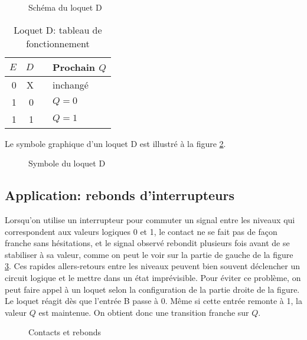 \documentclass[11pt]{article}
\begin{document}
\begin{figure}[htbp]
\centering

\caption{\label{fig:orge018db5}Schéma du loquet D}
\end{figure}

\begin{table}[htbp]
\caption{\label{tab:org54e7fb9}Loquet D: tableau de fonctionnement}
\centering
\begin{tabular}{rrll}
\(E\) & \(D\) &  & Prochain \(Q\)\\[0pt]
\hline
0 & X &  & inchangé\\[0pt]
1 & 0 &  & \(Q = 0\)\\[0pt]
1 & 1 &  & \(Q = 1\)\\[0pt]
\end{tabular}
\end{table}

Le symbole graphique d'un loquet D est illustré à la figure \ref{fig:org7994b22}.

\begin{figure}[htbp]
\centering

\caption{\label{fig:org7994b22}Symbole du loquet D}
\end{figure}

\subsection{Application: rebonds d'interrupteurs}
\label{sec:org9039284}

Lorsqu'on utilise un interrupteur pour commuter un signal entre les
niveaux qui correspondent aux valeurs logiques 0 et 1, le contact ne
se fait pas de façon franche sans hésitations, et le signal observé
rebondit plusieurs fois avant de se stabiliser à sa valeur, comme on
peut le voir sur la partie de gauche de la figure \ref{fig:orgfbd0de4}. Ces
rapides allers-retours entre les niveaux peuvent bien souvent
déclencher un circuit logique et le mettre dans un état
imprévisible. Pour éviter ce problème, on peut faire appel à un loquet
selon la configuration de la partie droite de la figure. Le loquet
réagit dès que l'entrée B passe à 0. Même si cette entrée remonte à 1,
la valeur \(Q\) est maintenue. On obtient donc une transition franche sur
\(Q\).

\begin{figure}[htbp]
\centering

\caption{\label{fig:orgfbd0de4}Contacts et rebonds}
\end{figure}
\end{document}
